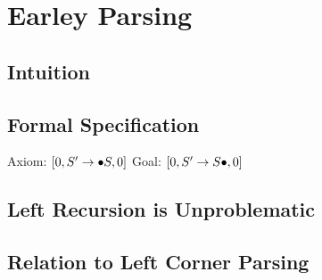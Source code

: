 \chapter{Earley Parsing}
\label{cha:Earley}

\section{Intuition}

\section{Formal Specification}
Axiom: $[0, S' \rewrite \psep S,0]$
Goal: $[0, S' \rewrite S \psep,0]$

\begin{prooftree}
\end{prooftree}

\begin{prooftree}
\end{prooftree}

\begin{prooftree}
\end{prooftree}

\section{Left Recursion is Unproblematic}

\section{Relation to Left Corner Parsing}
